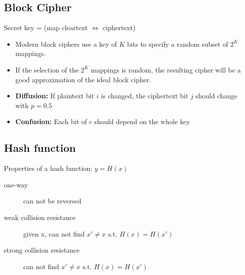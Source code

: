 \subsection{Block Cipher}
Secret key = (map cleartext $\Leftrightarrow$ ciphertext)
\begin{itemize}
	\item Modern block ciphers use a key of $K$ bits to specify a random
subset of $2^K$ mappings.
\item If the selection of the $2^K$ mappings is random, the resulting
cipher will be a good approximation of the ideal block cipher.
\item \textbf{Diffusion:} If plaintext bit $i$ is changed, the ciphertext bit $j$ should
  change with $p=0.5$
\item \textbf{Confusion:} Each bit of $c$ should depend on the whole key
\end{itemize}

\subsection{Hash function}
Properties of a hash function: $y = H(x)$
\begin{description}
    \item[one-way] can not be reversed 
    \item[weak collision resistance] given x, can not find $x' \not= x \text{ s.t. } H(x) = H(x')$
    \item[strong collision resistance] can not find $x' \not= x \text{ s.t. } H(x) = H(x')$
\end{description}

